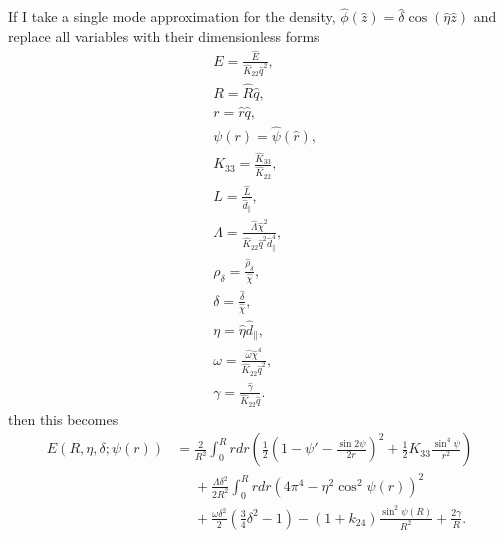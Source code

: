 \documentclass[12pt]{article}
\begin{document}
If I take a single mode approximation for the density, $\hat{\phi}(\hat{z})=\hat{\delta}\cos(\hat{\eta}\hat{z})$ and replace all variables with their dimensionless forms
\begin{align}
&E=\frac{\hat{E}}{\hat{K}_{22}\hat{q}^2},\\
&R=\hat{R}\hat{q},\\
&r=\hat{r}\hat{q},\\
&\psi(r)=\hat{\psi}(\hat{r}),\\
&K_{33}=\frac{\hat{K}_{33}}{\hat{K}_{22}},\\
&L=\frac{\hat{L}}{\hat{d}_{\parallel}},\\
&\Lambda=\frac{\hat{\Lambda}\hat{\chi}^2}{\hat{K}_{22}\hat{q}^2\hat{d}_{\parallel}^4},\label{eq:dimensionlessLambda}\\
&\rho_{\delta}=\frac{\hat{\rho}_{\delta}}{\hat{\chi}},\\
&\delta=\frac{\hat{\delta}}{\hat{\chi}},\\
&\eta=\hat{\eta}\hat{d}_{\parallel},\\
&\omega=\frac{\hat{\omega}\hat{\chi}^4}{\hat{K}_{22}\hat{q}^2},\label{eq:dimensionlessomega}\\
&\gamma=\frac{\hat{\gamma}}{\hat{K}_{22}\hat{q}}.
\end{align}
then this becomes
\begin{align}
E(R,\eta,\delta;\psi(r))&=\frac{2}{R^2}\int_0^{R}rdr\left(\frac{1}{2}\left(1-\psi'-\frac{\sin2\psi}{2r}\right)^2+\frac{1}{2}K_{33}\frac{\sin^4\psi}{r^2}\right)\nonumber\\
&\phantom{=}+\frac{\Lambda\delta^2}{2R^2}\int_0^Rrdr\left(4\pi^4-\eta^2\cos^2\psi(r)\right)^2\nonumber\\
&\phantom{=}+\frac{\omega\delta^2}{2}\left(\frac{3}{4}\delta^2-1\right)-(1+k_{24})\frac{\sin^2\psi(R)}{R^2}+\frac{2\gamma}{R}.
\end{align}


	
\clearpage


\end{document}
